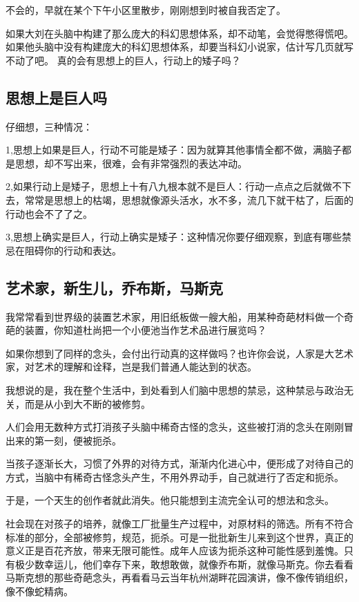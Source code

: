 不会的，早就在某个下午小区里散步，刚刚想到时被自我否定了。

如果大刘在头脑中构建了那么庞大的科幻思想体系，却不动笔，会觉得憋得慌吧。如果他头脑中没有构建庞大的科幻思想体系，却要当科幻小说家，估计写几页就写不动了吧。
真的会有思想上的巨人，行动上的矮子吗？

\subsection{思想上是巨人吗}

仔细想，三种情况：

1,思想上如果是巨人，行动不可能是矮子：因为就算其他事情全都不做，满脑子都是思想，却不写出来，很难，会有非常强烈的表达冲动。

2,如果行动上是矮子，思想上十有八九根本就不是巨人：行动一点点之后就做不下去，常常是思想上的枯竭，思想就像源头活水，水不多，流几下就干枯了，后面的行动也会不了了之。

3,思想上确实是巨人，行动上确实是矮子：这种情况你要仔细观察，到底有哪些禁忌在阻碍你的行动和表达。

\subsection{艺术家，新生儿，乔布斯，马斯克}

我常常看到世界级的装置艺术家，用旧纸板做一艘大船，用某种奇葩材料做一个奇葩的装置，你知道杜尚把一个小便池当作艺术品进行展览吗？

如果你想到了同样的念头，会付出行动真的这样做吗？也许你会说，人家是大艺术家，对艺术的理解和诠释，岂是我们普通人能达到的状态。

我想说的是，我在整个生活中，到处看到人们脑中思想的禁忌，这种禁忌与政治无关，而是从小到大不断的被修剪。

人们会用无数种方式打消孩子头脑中稀奇古怪的念头，这些被打消的念头在刚刚冒出来的第一刻，便被扼杀。

当孩子逐渐长大，习惯了外界的对待方式，渐渐内化进心中，便形成了对待自己的方式，当脑中有稀奇古怪念头产生，不用外界动手，自己就进行了否定和扼杀。

于是，一个天生的创作者就此消失。他只能想到主流完全认可的想法和念头。

社会现在对孩子的培养，就像工厂批量生产过程中，对原材料的筛选。所有不符合标准的部分，全部被修剪，规范，扼杀。可是一批批新生儿来到这个世界，真正的意义正是百花齐放，带来无限可能性。成年人应该为扼杀这种可能性感到羞愧。只有极少数幸运儿，他们幸存下来，敢想敢做，就像乔布斯，就像马斯克。你去看看马斯克想的那些奇葩念头，再看看马云当年杭州湖畔花园演讲，像不像传销组织，像不像蛇精病。

